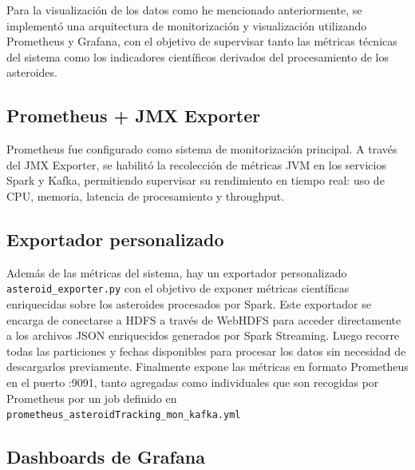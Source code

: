 \documentclass[12pt]{article}
\begin{document}
Para la visualización de los datos como he mencionado anteriormente, se implementó una arquitectura de monitorización y visualización 
utilizando Prometheus y Grafana, con el objetivo de supervisar tanto las métricas técnicas del sistema como los indicadores 
científicos derivados del procesamiento de los asteroides.

\subsection{Prometheus + JMX Exporter}

Prometheus fue configurado como sistema de monitorización principal. A través del JMX Exporter, se habilitó la recolección de métricas 
JVM en los servicios Spark y Kafka, permitiendo supervisar su rendimiento en tiempo real: uso de CPU, memoria, latencia de 
procesamiento y throughput.

\subsection{Exportador personalizado}

Además de las métricas del sistema, hay un exportador personalizado \texttt{asteroid\_exporter.py} con el objetivo de 
exponer métricas científicas enriquecidas sobre los asteroides procesados por Spark.
Este exportador se encarga de conectarse a HDFS a través de WebHDFS para acceder directamente a los archivos JSON enriquecidos generados 
por Spark Streaming. Luego recorre todas las particiones y fechas disponibles para procesar los datos sin necesidad de descargarlos previamente.
Finalmente expone las métricas en formato Prometheus en el puerto :9091, tanto agregadas como individuales que son recogidas por 
Prometheus por un job definido en \texttt{prometheus\_asteroidTracking\_mon\_kafka.yml}

\subsection{Dashboards de Grafana}
\end{document}

